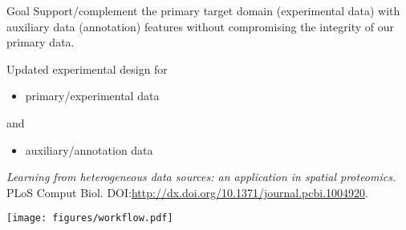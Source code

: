 \begin{frame}

  \begin{block}{Goal}
    Support/complement the primary target domain (experimental data)
    with auxiliary data (annotation) features without compromising the
    integrity of our primary data. 

    \bigskip 

    Updated experimental design for 

    \begin{itemize}
    \item primary/experimental data
    \end{itemize}
  
    and 

    \begin{itemize}
    \item auxiliary/annotation data
    \end{itemize}

  \end{block}

  \begin{small}
    \cite{Breckels:2016} \textit{Learning from heterogeneous data
      sources: an application in spatial proteomics.}  PLoS Comput
    Biol. DOI:\href{10.1371/journal.pcbi.1004920}{http://dx.doi.org/10.1371/journal.pcbi.1004920}.

  \end{small}

\end{frame}

\begin{frame}
  \begin{center}
    \texttt{[image: figures/workflow.pdf]}      
  \end{center}
\end{frame}

